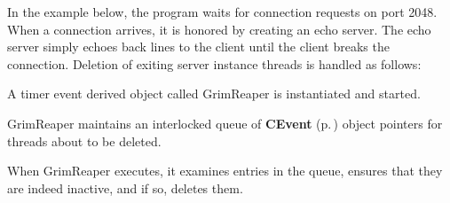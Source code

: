 In the example below, the program waits for connection requests on port 2048. When a connection arrives, it is honored by creating an echo server. The echo server simply echoes back lines to the client until the client breaks the connection. Deletion of exiting server instance threads is handled as follows:\begin{CompactItemize}
\item 
A timer event derived object called Grim\-Reaper is instantiated and started.\item 
Grim\-Reaper maintains an interlocked queue of {\bf CEvent} {\rm (p.\,\pageref{classCEvent})} object pointers for threads about to be deleted.\item 
When Grim\-Reaper executes, it examines entries in the queue, ensures that they are indeed inactive, and if so, deletes them.\end{CompactItemize}


